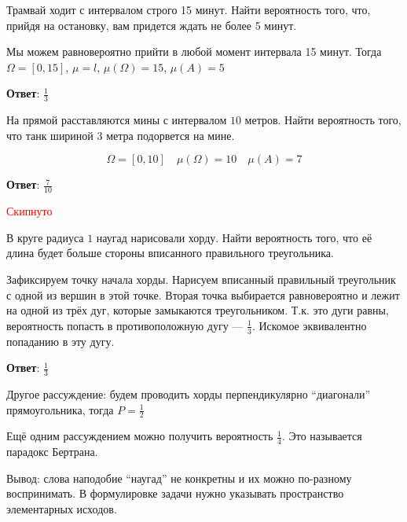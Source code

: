 

\cfoot{}



\begin{exercise}
    Трамвай ходит с интервалом строго 15 минут. Найти вероятность того, что, прийдя на остановку, вам придется ждать не более 5 минут.

    Мы можем равновероятно прийти в любой момент интервала 15 минут. Тогда \(\Omega = [0,15]\), \(\mu = l\), \(\mu(\Omega) = 15\), \(\mu(A) = 5\)

    \textbf{Ответ}: \(\frac{1}{3}\)
\end{exercise}

\begin{exercise}
    На прямой расставляются мины с интервалом \(10\) метров. Найти вероятность того, что танк шириной \(3\) метра подорвется на мине.

    \[\Omega = [0, 10] \quad \mu(\Omega) = 10 \quad \mu(A) = 7\]

    \textbf{Ответ}: \(\frac{7}{10}\)
\end{exercise}

\begin{exercise}
    \textcolor{red}{Скипнуто}
\end{exercise}

\begin{exercise}
    В круге радиуса \(1\) наугад нарисовали хорду. Найти вероятность того, что её длина будет больше стороны вписанного правильного треугольника.

    Зафиксируем точку начала хорды. Нарисуем вписанный правильный треугольник с одной из вершин в этой точке. Вторая точка выбирается равновероятно и лежит на одной из трёх дуг, которые замыкаются треугольником. Т.к. это дуги равны, вероятность попасть в противоположную дугу --- \(\frac{1}{3}\). Искомое эквивалентно попаданию в эту дугу.

    \textbf{Ответ}: \(\frac{1}{3}\)

    Другое рассуждение: будем проводить хорды перпендикулярно ``диагонали'' прямоугольника, тогда \(P = \frac{1}{2}\)

    Ещё одним рассуждением можно получить вероятность \(\frac{1}{4}\). Это называется парадокс Бертрана.

    Вывод: слова наподобие ``наугад'' не конкретны и их можно по-разному воспринимать. В формулировке задачи нужно указывать пространство элементарных исходов.
\end{exercise}

